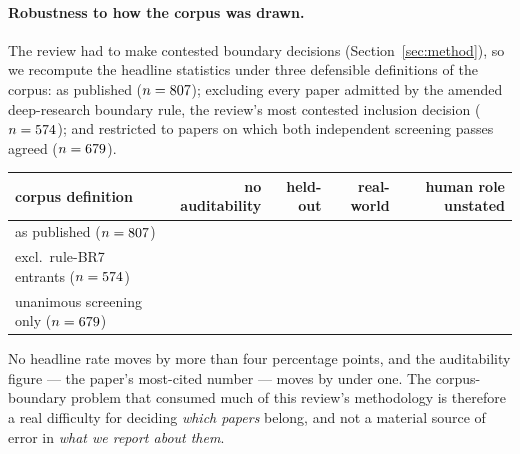 \paragraph{Robustness to how the corpus was drawn.} The review had to make contested
boundary decisions (Section~\ref{sec:method}), so we recompute the headline statistics under
three defensible definitions of the corpus: as published ($n=807{}$); excluding every
paper admitted by the amended deep-research boundary rule, the review's most contested
inclusion decision ($n=574{}$); and restricted to papers on which both independent
screening passes agreed ($n=679{}$).

\begin{center}\small
\begin{tabular}{lrrrr}
\toprule
corpus definition & no auditability & held-out & real-world & human role unstated \\
\midrule
as published ($n=807{}$)          & \pctAuditNone{} & \pctHeldOut{} & \pctRealWorld{} & \pctHumanUnspec{} \\
excl.\ rule-BR7 entrants ($n=574{}$) & \pctAuditNoneNoBRSeven{} & \pctHeldOutNoBRSeven{} & \pctRealWorldNoBRSeven{} & \pctHumanUnspecNoBRSeven{} \\
unanimous screening only ($n=679{}$) & \pctAuditNoneUnanOnly{} & \pctHeldOutUnanOnly{} & \pctRealWorldUnanOnly{} & \pctHumanUnspecUnanOnly{} \\
\bottomrule
\end{tabular}
\end{center}

No headline rate moves by more than four percentage points, and the auditability figure --- the
paper's most-cited number --- moves by under one. The corpus-boundary problem that consumed
much of this review's methodology is therefore a real difficulty for deciding \emph{which
papers} belong, and not a material source of error in \emph{what we report about them}.

